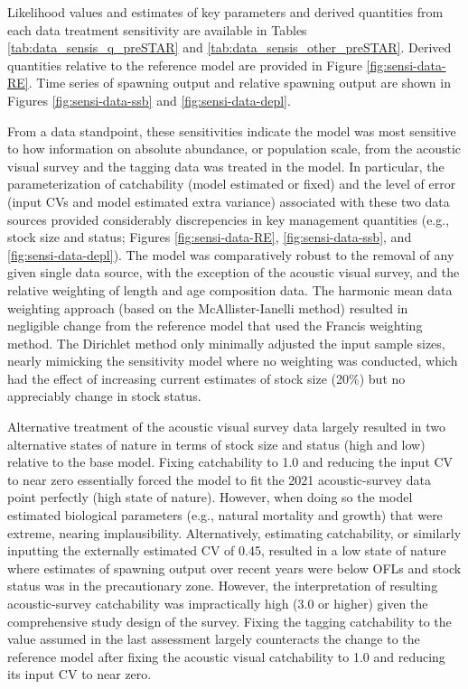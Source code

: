 \documentclass[11pt,
  english,
  letterpaper,
]{article}
\begin{document}
Likelihood values and estimates of key parameters and derived quantities from each data treatment sensitivity are available in Tables \ref{tab:data_sensis_q_preSTAR} and \ref{tab:data_sensis_other_preSTAR}. Derived quantities relative to the reference model are provided in Figure \ref{fig:sensi-data-RE}. Time series of spawning output and relative spawning output are shown in Figures \ref{fig:sensi-data-ssb} and \ref{fig:sensi-data-depl}.

From a data standpoint, these sensitivities indicate the model was most sensitive to how information on absolute abundance, or population scale, from the acoustic visual survey and the tagging data was treated in the model. In particular, the parameterization of catchability (model estimated or fixed) and the level of error (input CVs and model estimated extra variance) associated with these two data sources provided considerably discrepencies in key management quantities (e.g., stock size and status; Figures \ref{fig:sensi-data-RE}, \ref{fig:sensi-data-ssb}, and \ref{fig:sensi-data-depl}). The model was comparatively robust to the removal of any given single data source, with the exception of the acoustic visual survey, and the relative weighting of length and age composition data. The harmonic mean data weighting approach (based on the McAllister-Ianelli method) resulted in negligible change from the reference model that used the Francis weighting method. The Dirichlet method only minimally adjusted the input sample sizes, nearly mimicking the sensitivity model where no weighting was conducted, which had the effect of increasing current estimates of stock size (20\%) but no appreciably change in stock status.

Alternative treatment of the acoustic visual survey data largely resulted in two alternative states of nature in terms of stock size and status (high and low) relative to the base model. Fixing catchability to 1.0 and reducing the input CV to near zero essentially forced the model to fit the 2021 acoustic-survey data point perfectly (high state of nature). However, when doing so the model estimated biological parameters (e.g., natural mortality and growth) that were extreme, nearing implausibility. Alternatively, estimating catchability, or similarly inputting the externally estimated CV of 0.45, resulted in a low state of nature where estimates of spawning output over recent years were below OFLs and stock status was in the precautionary zone. However, the interpretation of resulting acoustic-survey catchability was impractically high (3.0 or higher) given the comprehensive study design of the survey. Fixing the tagging catchability to the value assumed in the last assessment largely counteracts the change to the reference model after fixing the acoustic visual catchability to 1.0 and reducing its input CV to near zero.
\end{document}
